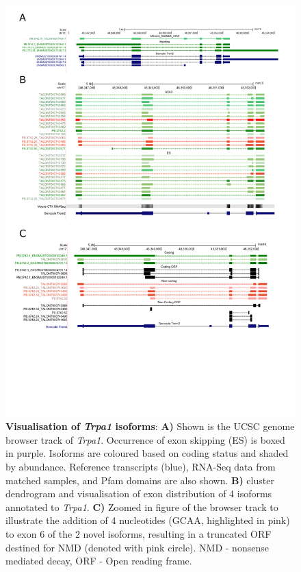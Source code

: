 \begin{landscape}
	\begin{figure}[htp]
		\begin{center}
			\includegraphics[page=6,trim={0 5cm 0 0},scale = 0.85]{Figures/pdfjoiner.pdf}
		\end{center}
		\captionsetup{width=1.5\textwidth}
		\caption[Visualisation of \textit{Trpa1} isoforms]%
		{\textbf{Visualisation of \textit{Trpa1} isoforms}: \textbf{A)} Shown is the UCSC genome browser track of \textit{Trpa1}. Occurrence of exon skipping (ES) is boxed in purple. Isoforms are coloured based on coding status and shaded by abundance. Reference transcripts (blue), RNA-Seq data from matched samples, and Pfam domains are also shown. \textbf{B)} cluster dendrogram and visualisation of exon distribution of 4 isoforms annotated to \textit{Trpa1}. \textbf{C)} Zoomed in figure of the browser track to illustrate the addition of 4 nucleotides (GCAA, highlighted in pink) to exon 6 of the 2 novel isoforms, resulting in a truncated ORF destined for NMD (denoted with pink circle). NMD - nonsense mediated decay, ORF - Open reading frame.}   
		\label{fig:trpa1}
	\end{figure}
\end{landscape}

